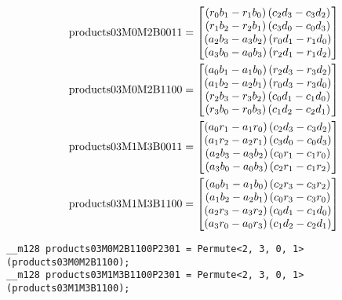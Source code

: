 \begin{align*}
\mathrm{products03M0M2B0011} 
&=
\begin{bmatrix}
\left(r_0b_1 - r_1b_0\right)\left(c_2d_3 - c_3d_2\right)\\
\left(r_1b_2 - r_2b_1\right)\left(c_3d_0 - c_0d_3\right)\\
\left(a_2b_3 - a_3b_2\right)\left(r_0d_1 - r_1d_0\right)\\
\left(a_3b_0 - a_0b_3\right)\left(r_2d_1 - r_1d_2\right)\\
\end{bmatrix}
\\
\mathrm{products03M0M2B1100} 
&=
\begin{bmatrix}
\left(a_0b_1 - a_1b_0\right)\left(r_2d_3 - r_3d_2\right)\\
\left(a_1b_2 - a_2b_1\right)\left(r_0d_3 - r_3d_0\right)\\
\left(r_2b_3 - r_3b_2\right)\left(c_0d_1 - c_1d_0\right)\\
\left(r_3b_0 - r_0b_3\right)\left(c_1d_2 - c_2d_1\right)\\
\end{bmatrix}
\\
\mathrm{products03M1M3B0011} 
&=
\begin{bmatrix}
\left(a_0r_1 - a_1r_0\right)\left(c_2d_3 - c_3d_2\right)\\
\left(a_1r_2 - a_2r_1\right)\left(c_3d_0 - c_0d_3\right)\\
\left(a_2b_3 - a_3b_2\right)\left(c_0r_1 - c_1r_0\right)\\
\left(a_3b_0 - a_0b_3\right)\left(c_2r_1 - c_1r_2\right)\\
\end{bmatrix}
\\
\mathrm{products03M1M3B1100} 
&=
\begin{bmatrix}
\left(a_0b_1 - a_1b_0\right)\left(c_2r_3 - c_3r_2\right)\\
\left(a_1b_2 - a_2b_1\right)\left(c_0r_3 - c_3r_0\right)\\
\left(a_2r_3 - a_3r_2\right)\left(c_0d_1 - c_1d_0\right)\\
\left(a_3r_0 - a_0r_3\right)\left(c_1d_2 - c_2d_1\right)\\
\end{bmatrix}
\end{align*}


\begin{verbatim}
__m128 products03M0M2B1100P2301 = Permute<2, 3, 0, 1>(products03M0M2B1100);
__m128 products03M1M3B1100P2301 = Permute<2, 3, 0, 1>(products03M1M3B1100);
\end{verbatim}

